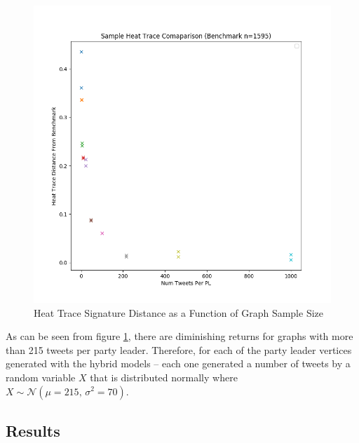 \begin{singlespacing}
    \begin{figure}[H]
    \centering
    \includegraphics[scale=0.4]{Figures/dist_from_original_graph_over_sample_size}
    \caption[Heat Trace Signature Distance as a Function of Graph Sample Size]{Heat Trace Signature Distance as a Function of Graph Sample Size}
    \label{fig:dist_from_original_graph_over_sample_size}
    \end{figure}
\end{singlespacing}

As can be seen from figure \ref{fig:dist_from_original_graph_over_sample_size}, there
are diminishing returns for graphs with more than 215 tweets per party leader.
Therefore, for each of the party leader vertices generated with the hybrid
models -- each one generated a number of tweets by a random variable $X$ that is
distributed normally where $X \sim \mathcal{N}(\mu=215,\,\sigma^{2}=70)$.

\subsection{Results}\label{sec:SBMsResults}

